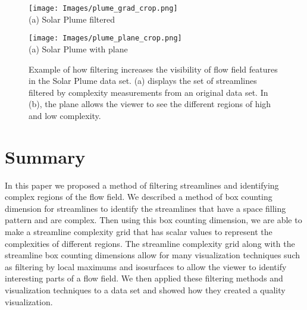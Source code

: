 \documentclass{egpubl}
\begin{document}
\begin{figure}[h]
        \centering
               	\begin{minipage}{0.47\linewidth}
                      	\centering \small
                        \texttt{[image: Images/plume\_grad\_crop.png]}\\(a) Solar Plume filtered
                \end{minipage}
                \begin{minipage}{0.47\linewidth}
                        \centering \small
                        \texttt{[image: Images/plume\_plane\_crop.png]}\\(a) Solar Plume with plane
                \end{minipage}
        \caption{Example of how filtering increases the visibility of flow field features in the Solar Plume data set. (a) displays the set of streamlines filtered by complexity measurements from an original data set. In (b), the plane allows the viewer to see the different regions of high and low complexity.}
        \label{fig:plume_lines}
\end{figure}

\section{Summary}

In this paper we proposed a method of filtering streamlines and identifying complex regions of the flow field.
We described a method of box counting dimension for streamlines to identify the streamlines that have a space filling pattern and are complex.
Then using this box counting dimension, we are able to make a streamline complexity grid that has scalar values to represent the complexities of different regions.
The streamline complexity grid along with the streamline box counting dimensions allow for many visualization techniques such as filtering by local maximums and isosurfaces to allow the viewer to identify interesting parts of a flow field.
We then applied these filtering methods and visualization techniques to a data set and showed how they created a quality visualization.


\clearpage
%


\end{document}
